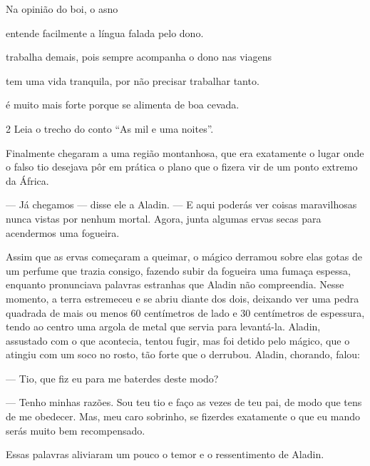 \begin{myquote}
\begin{myescolha}
Na opinião do boi, o asno

\begin{escolha}
\item entende facilmente a língua falada pelo dono.

\item trabalha demais, pois sempre acompanha o dono nas viagens

\item tem uma vida tranquila, por não precisar trabalhar tanto.

\item é muito mais forte porque se alimenta de boa cevada.
\end{escolha}

\num{2} Leia o trecho do conto ``As mil e uma noites''.

\begin{myquote}
Finalmente chegaram a uma região montanhosa, que era
exatamente o lugar onde o falso tio desejava pôr em prática o plano que
o fizera vir de um ponto extremo da África.

--- Já chegamos --- disse ele a Aladin. --- E aqui poderás ver coisas
maravilhosas nunca vistas por nenhum mortal. Agora, junta algumas ervas
secas para acendermos uma fogueira.

Assim que as ervas começaram a queimar, o mágico derramou sobre elas
gotas de um perfume que trazia consigo, fazendo subir da fogueira uma
fumaça espessa, enquanto pronunciava palavras estranhas que Aladin não
compreendia. Nesse momento, a terra estremeceu e se abriu diante dos
dois, deixando ver uma pedra quadrada de mais ou menos 60 centímetros de
lado e 30 centímetros de espessura, tendo ao centro uma argola de metal
que servia para levantá-la. Aladin, assustado com o que acontecia,
tentou fugir, mas foi detido pelo mágico, que o atingiu com um soco no
rosto, tão forte que o derrubou. Aladin, chorando, falou:

--- Tio, que fiz eu para me baterdes deste modo?

--- Tenho minhas razões. Sou teu tio e faço as vezes de teu pai, de modo
que tens de me obedecer. Mas, meu caro sobrinho, se fizerdes exatamente
o que eu mando serás muito bem recompensado.

Essas palavras aliviaram um pouco o temor e o ressentimento de Aladin.

\end{myquote}


\end{myescolha}
\end{myquote}
